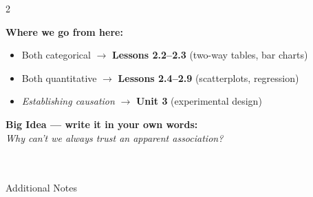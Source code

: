 \documentclass[10pt]{article}
\begin{document}
\vspace{0.1in}

\begin{spiralbox}
\small
\begin{multicols}{2}

\textbf{Where we go from here:}
\begin{itemize}[itemsep=3pt]
  \item Both categorical $\to$ \textbf{Lessons 2.2--2.3} (two-way tables, bar charts)
  \item Both quantitative $\to$ \textbf{Lessons 2.4--2.9} (scatterplots, regression)
  \item \textit{Establishing causation} $\to$ \textbf{Unit 3} (experimental design)
\end{itemize}

\columnbreak

\textbf{Big Idea --- write it in your own words:}\\
\textit{Why can't we always trust an apparent association?}\\[2pt]
\writeline\\[1pt]\writeline\\[1pt]\writeline

\end{multicols}
\end{spiralbox}

\vspace{0.1in}

\begin{notesbox}{Additional Notes}
\vspace{0pt}
\writeline\\\writeline\\\writeline\\\writeline\\\writeline\\\writeline
\end{notesbox}
\end{document}
